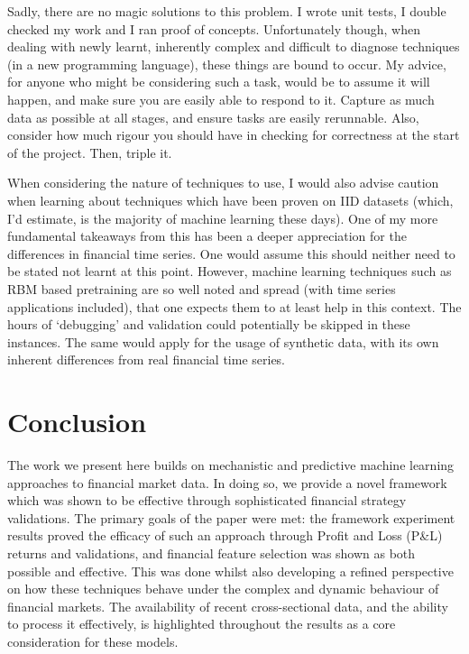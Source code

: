 \documentclass[a4paper,11pt,oneside]{article}
\theoremstyle{plain}
\theoremstyle{definition}
\begin{document}
	Sadly, there are no magic solutions to this problem. I wrote unit tests, I double checked my work and I ran proof of concepts. Unfortunately though, when dealing with newly learnt, inherently complex and difficult to diagnose techniques (in a new programming language), these things are bound to occur. My advice, for anyone who might be considering such a task, would be to assume it will happen, and make sure you are easily able to respond to it. Capture as much data as possible at all stages, and ensure tasks are easily rerunnable. Also, consider how much rigour you should have in checking for correctness at the start of the project. Then, triple it.\newline
	
	When considering the nature of techniques to use, I would also advise caution when learning about techniques which have been proven on IID datasets (which, I'd estimate, is the majority of machine learning these days). One of my more fundamental takeaways from this has been a deeper appreciation for the differences in financial time series. One would assume this should neither need to be stated not learnt at this point. However, machine learning techniques such as RBM based pretraining are so well noted and spread (with time series applications included), that one expects them to at least help in this context. The hours of `debugging' and validation could potentially be skipped in these instances. The same would apply for the usage of synthetic data, with its own inherent differences from real financial time series. \newline
	
	
	\newpage
	\section{Conclusion}\label{Conclusion}
	
	The work we present here builds on mechanistic and predictive machine learning approaches to financial market data. In doing so, we provide a novel framework which was shown to be effective through sophisticated financial strategy validations. The primary goals of the paper were met: the framework experiment results proved the efficacy of such an approach through Profit and Loss (P\&L) returns and validations, and financial feature selection was shown as both possible and effective. This was done whilst also developing a refined perspective on how these techniques behave under the complex and dynamic behaviour of financial markets. The availability of recent cross-sectional data, and the ability to process it effectively, is highlighted throughout the results as a core consideration for these models. \newline
	
\end{document}
